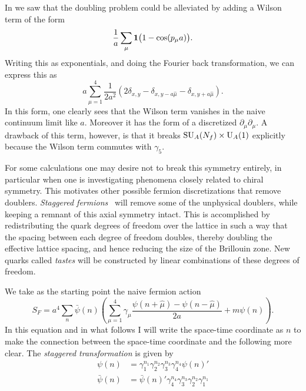 In  we saw that the doubling problem could
be alleviated by adding a Wilson term of the form
\begin{equation}
  \frac{1}{a}\sum_\mu{\mathbf 1}\big(1-\cos(p_\mu a)\big).
\end{equation}
Writing this as exponentials, and doing the Fourier back transformation,
we can express this as
\begin{equation}
  a\sum_{\mu=1}^4\frac{1}{2a^2}
\left(2\delta_{x,y}-\delta_{x,y-a\hat{\mu}}-\delta_{x,y+a\hat{\mu}}\right).
\end{equation}
In this form, one clearly sees that the Wilson term vanishes in the
naive continuum limit like $a$. Moreover it has the form of a
discretized $\partial_\mu\partial_\mu$. A drawback of this term,
however, is that it breaks $\operatorname{SU}_A(N_f)\times\operatorname{U}_A(1)$ explicitly
because the Wilson term commutes with $\gamma_5$.

For some calculations one may desire not to break this symmetry entirely,
in particular when one is investigating phenomena closely related to
chiral symmetry. This motivates other possible fermion discretizations
that remove doublers. {\it Staggered fermions}~\cite{kogut_hamiltonian_1975}
will remove some of the 
unphysical doublers, while keeping a remnant of this axial symmetry intact. 
This is accomplished by redistributing the quark degrees of freedom over
the lattice in such a way that the spacing between each degree of freedom
doubles, thereby doubling the effective lattice spacing, and hence
reducing the size of the Brillouin zone. New quarks called {\it tastes}
will be constructed by linear combinations of these degrees of freedom.

We take as the starting point the naive fermion action
\begin{equation}
 S_F
     =a^4\sum_n\bar{\psi}(n)\left(\sum_{\mu=1}^4\gamma_\mu
       \frac{\psi(n+\hat{\mu})-\psi(n-\hat{\mu})}{2a}
       +m\psi(n)\right).
\end{equation}
In this equation and in what follows I will write the space-time coordinate
as $n$ to make the connection between the space-time coordinate and the
following more clear. The {\it staggered
transformation} is given by
\begin{equation}\begin{aligned}
\psi(n)&=\gamma_1^{n_1}\gamma_2^{n_2}\gamma_3^{n_3}\gamma_4^{n_4}\psi(n)'\\
\bar{\psi}(n)
   &=\bar{\psi}(n)'\gamma_4^{n_4}\gamma_3^{n_3}\gamma_2^{n_2}\gamma_1^{n_1}
\end{aligned}\end{equation}

